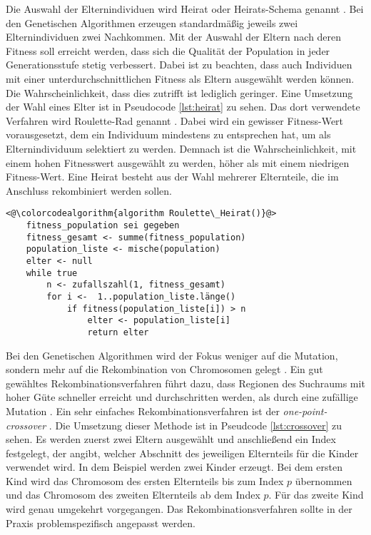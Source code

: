 Die Auswahl der Elternindividuen wird Heirat oder Heirats-Schema genannt \cite[S.~204]{schoeneburg}. Bei den Genetischen Algorithmen erzeugen standardmäßig jeweils zwei Elternindividuen zwei Nachkommen. 
Mit der Auswahl der Eltern nach deren Fitness soll erreicht werden, dass sich die Qualität der Population in jeder Generationsstufe stetig verbessert.
Dabei ist zu beachten, dass auch Individuen mit einer unterdurchschnittlichen Fitness als Eltern ausgewählt werden können. Die Wahrscheinlichkeit, dass dies zutrifft ist lediglich geringer.
Eine Umsetzung der Wahl eines Elter ist in Pseudocode \ref{lst:heirat} zu sehen. Das dort verwendete Verfahren wird Roulette-Rad genannt \cite[S.~204]{schoeneburg}. Dabei wird ein gewisser Fitness-Wert vorausgesetzt, dem ein Individuum mindestens zu entsprechen hat, um als Elternindividuum selektiert zu werden. Demnach ist die Wahrscheinlichkeit, mit einem hohen Fitnesswert ausgewählt zu werden, höher als mit einem niedrigen Fitness-Wert. Eine Heirat besteht aus der Wahl mehrerer Elternteile, die im Anschluss rekombiniert werden sollen.
\begin{lstlisting}[caption={Roulette-Rad}, firstnumber=1, captionpos=b,label=lst:heirat]
<@\colorcodealgorithm{algorithm Roulette\_Heirat()}@>
	fitness_population sei gegeben
	fitness_gesamt <- summe(fitness_population)
	population_liste <- mische(population)
	elter <- null
	while true
		n <- zufallszahl(1, fitness_gesamt)
		for i <-  1..population_liste.länge()
			if fitness(population_liste[i]) > n
				elter <- population_liste[i]
				return elter
\end{lstlisting}
Bei den Genetischen Algorithmen wird der Fokus weniger auf die Mutation, sondern mehr auf die Rekombination von Chromosomen gelegt \cite[S.~198]{schoeneburg}. Ein gut gewähltes Rekombinationsverfahren führt dazu, dass Regionen des Suchraums mit hoher Güte schneller erreicht und durchschritten werden, als durch eine zufällige Mutation \cite[S.~198]{schoeneburg}.
Ein sehr einfaches Rekombinationsverfahren ist der \textit{one-point-crossover} \cite[S.~198]{schoeneburg}. Die Umsetzung dieser Methode ist in Pseudcode \ref{lst:crossover} zu sehen. Es werden zuerst zwei Eltern ausgewählt und anschließend ein Index festgelegt, der angibt, welcher Abschnitt des jeweiligen Elternteils für die Kinder verwendet wird.
In dem Beispiel werden zwei Kinder erzeugt. Bei dem ersten Kind wird das Chromosom des ersten Elternteils bis zum Index $p$ übernommen und das Chromosom des zweiten Elternteils ab dem Index $p$. Für das zweite Kind wird genau umgekehrt vorgegangen. Das Rekombinationsverfahren sollte in der Praxis problemspezifisch angepasst werden.

